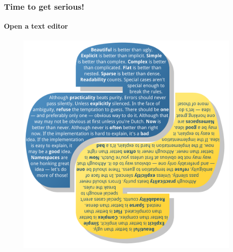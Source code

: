 \documentclass{beamer}
\begin{document}
\begin{frame}
\frametitle{Time to get serious!}
\framesubtitle{Open a text editor}



\begin{figure}

\includegraphics[scale=0.3]{zen.pdf}
\end{figure}
\end{frame}
\end{document}
